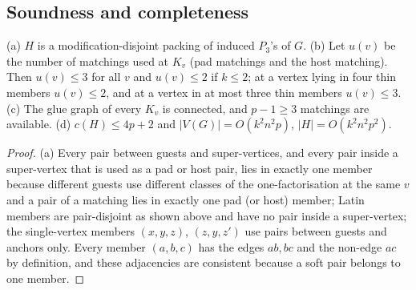 \subsection{Soundness and completeness}\label{sec:hsound}
\begin{lemma}\label{lem:hpar}
(a) $H$ is a modification-disjoint packing of induced $P_3$'s of $G$. (b) Let $u(v)$ be the number of matchings used at $K_v$ (pad matchings and the host matching). Then $u(v)\le3$ for all $v$ and $u(v)\le 2$ if $k\le2$; at a vertex lying in four thin members $u(v)\le2$, and at a vertex in at most three thin members $u(v)\le3$. (c) The glue graph of every $K_v$ is connected, and $p-1\ge3$ matchings are available. (d) $c(H)\le 4p+2$ and $|V(G)|=O(k^2n^2p)$, $|H|=O(k^2n^2p^2)$.
\end{lemma}
\begin{proof}
(a) Every pair between guests and super-vertices, and every pair inside a super-vertex that is used as a pad or host pair, lies in exactly one member because different guests use different classes of the one-factorisation at the same $v$ and a pair of a matching lies in exactly one pad (or host) member; Latin members are pair-disjoint as shown above and have no pair inside a super-vertex; the single-vertex members $(x,y,z)$, $(z,y,z')$ use pairs between guests and anchors only. Every member $(a,b,c)$ has the edges $ab,bc$ and the non-edge $ac$ by definition, and these adjacencies are consistent because a soft pair belongs to one member.


\end{proof}
